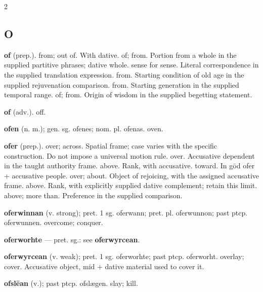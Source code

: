 \begin{multicols*}{2}
\subsection*{O}
\textbf{of} (prep.). from; out of. With dative. of; from. Portion from a whole in the supplied partitive phrases; dative whole. sense for sense. Literal correspondence in the supplied translation expression. from. Starting condition of old age in the supplied rejuvenation comparison. from. Starting generation in the supplied temporal range. of; from. Origin of wisdom in the supplied begetting statement.\par
\textbf{of} (adv.). off.\par
\textbf{ofen} (n. m.); gen. sg. ofenes; nom. pl. ofenas. oven.\par
\textbf{ofer} (prep.). over; across. Spatial frame; case varies with the specific construction. Do not impose a universal motion rule. over. Accusative dependent in the taught authority frame. above. Rank, with accusative. toward. In gōd ofer + accusative people. over; about. Object of rejoicing, with the assigned accusative frame. above. Rank, with explicitly supplied dative complement; retain this limit. above; more than. Preference in the supplied comparison.\par
\textbf{oferwinnan} (v. strong); pret. 1 sg. oferwann; pret. pl. oferwunnon; past ptcp. oferwunnen. overcome; conquer.\par
\textbf{oferworhte} — pret. sg.: see \textbf{oferwyrcean}.\par
\textbf{oferwyrcean} (v. weak); pret. 1 sg. oferworhte; past ptcp. oferworht. overlay; cover. Accusative object, mid + dative material used to cover it.\par
\textbf{ofslēan} (v.); past ptcp. ofslægen. slay; kill.\par

\end{multicols*}
